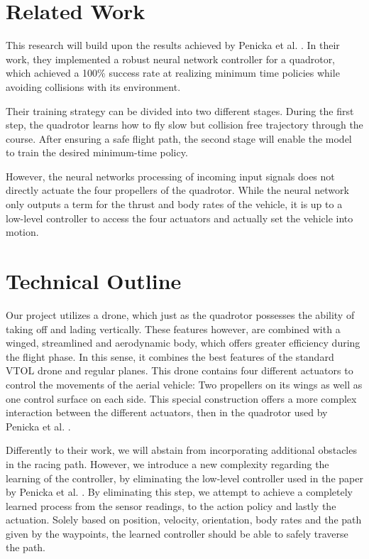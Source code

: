 \documentclass[conference]{IEEEtran}
\begin{document}
\section{Related Work} %
This research will build upon the results achieved by Penicka et al. \cite{Penicka_2022}. In their work, they implemented a robust neural network controller for a quadrotor, which achieved a 100\% success rate at realizing minimum time policies while avoiding collisions with its environment. 

Their training strategy can be divided into two different stages. During the first step, the quadrotor learns how to fly slow but collision free trajectory through the course. After ensuring a safe flight path, the second stage will enable the model to train the desired minimum-time policy. 

However, the neural networks processing of incoming input signals does not directly actuate the four propellers of the quadrotor. While the neural network only outputs a term for the thrust and body rates of the vehicle, it is up to a low-level controller to access the four actuators and actually set the vehicle into motion. 


\section{Technical Outline}
Our project utilizes a drone, which just as the quadrotor possesses the ability of taking off and lading vertically. These features however, are combined with a winged, streamlined and aerodynamic body, which offers greater efficiency during the flight phase. In this sense, it combines the best features of the standard VTOL drone and regular planes. This drone contains four different actuators to control the movements of the aerial vehicle: Two propellers on its wings as well as one control surface on each side. This special construction offers a more complex interaction between the different actuators, then in the quadrotor used by Penicka et al. \cite{anarticle}.

Differently to their work, we will abstain from incorporating additional obstacles in the racing path. However, we introduce a new complexity regarding the learning of the controller, by eliminating the low-level controller used in the paper by Penicka et al. \cite{anarticle}. By eliminating this step, we attempt to achieve a completely learned process from the sensor readings, to the action policy and lastly the actuation. Solely based on position, velocity, orientation, body rates and the path given by the waypoints, the learned controller should be able to safely traverse the path. 
\end{document}
